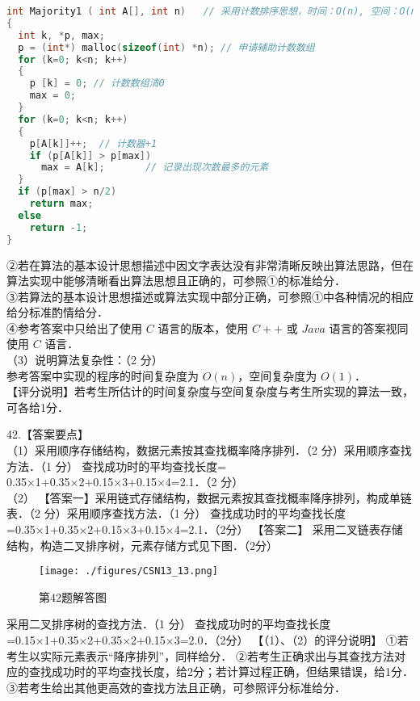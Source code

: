 \begin{lstlisting}[language=cpp]
int Majority1 ( int A[], int n)   // 采用计数排序思想，时间：O(n), 空间：O(n) 
{ 
  int k, *p, max;
  p = (int*) malloc(sizeof(int) *n); // 申请辅助计数数组
  for (k=0; k<n; k++)
  {
    p [k] = 0; // 计数数组清0
    max = 0;
  }
  for (k=0; k<n; k++)
  { 
    p[A[k]]++;  // 计数器+1
    if (p[A[k]] > p[max])
      max = A[k];       // 记录出现次数最多的元素 
  } 
  if (p[max] > n/2)
    return max;
  else
    return -1;
} 
\end{lstlisting}
②若在算法的基本设计思想描述中因文字表达没有非常清晰反映出算法思路，但在算法实现中能够清晰看出算法思想且正确的，可参照①的标准给分． \\
③若算法的基本设计思想描述或算法实现中部分正确，可参照①中各种情况的相应给分标准酌情给分． \\
④参考答案中只给出了使用 $C$ 语言的版本，使用 $C++$ 或 $Java$ 语言的答案视同使用 $C$ 语言． \\
（3）说明算法复杂性：（2 分） \\
参考答案中实现的程序的时间复杂度为 $O(n)$，空间复杂度为 $O(1)$． \\
【评分说明】若考生所估计的时间复杂度与空间复杂度与考生所实现的算法一致，可各给1分．

42.【答案要点】 \\
（1）采用顺序存储结构，数据元素按其查找概率降序排列．（2 分）采用顺序查找方法．（1 分） 
查找成功时的平均查找长度= 0.35×1+0.35×2+0.15×3+0.15×4=2.1．（2 分） \\
（2） 【答案一】采用链式存储结构，数据元素按其查找概率降序排列，构成单链表．（2 分）采用顺序查找方法．（1 分） 
查找成功时的平均查找长度=0.35×1+0.35×2+0.15×3+0.15×4=2.1．（2分） 
【答案二】 
采用二叉链表存储结构，构造二叉排序树，元素存储方式见下图．（2分）
\begin{figure}[ht]
\centering
\texttt{[image: ./figures/CSN13\_13.png]}
\caption{第42题解答图} \label{CSN13_fig13}
\end{figure}
 采用二叉排序树的查找方法．（1 分） 
查找成功时的平均查找长度=0.15×1+0.35×2+0.35×2+0.15×3=2.0．（2分）
【（1）、（2）的评分说明】 
①若考生以实际元素表示“降序排列”，同样给分．
②若考生正确求出与其查找方法对应的查找成功时的平均查找长度，给2分；若计算过程正确，但结果错误，给1分．
③若考生给出其他更高效的查找方法且正确，可参照评分标准给分．

